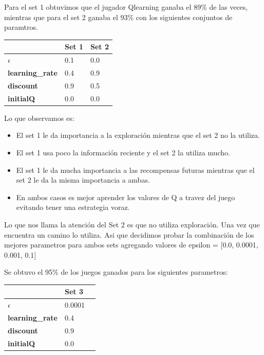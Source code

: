 Para el set 1 obtuvimos que el jugador Qlearning ganaba el 89\% de las veces, mientras que para el set 2 ganaba el 93\% con los siguientes conjuntos de paramtros. 

\begin{center}
    \begin{tabular}{| l | l | l |}
    \hline
     					    &  \textbf{Set 1} & \textbf{Set 2} \\ \hline
    \textbf{$\epsilon$}     &  0.1   		  & 0.0   \\
    \textbf{learning\_rate} &  0.4   		  & 0.9   \\ 
    \textbf{discount}       &  0.9  		  & 0.5   \\ 
	\textbf{initialQ} 		&  0.0   		  & 0.0   \\
    \hline
    \end{tabular}
\end{center}

Lo que observamos es:
\begin{itemize}
\item El set 1 le da importancia a la exploración mientras que el set 2 no la utiliza. \\
\item El set 1 usa poco la información reciente y el set 2 la utiliza mucho. \\
\item El set 1 le da mucha importancia a las recompensas futuras mientras que el set 2 le da la misma importancia a ambas. \\
\item En ambos casos es mejor aprender los valores de Q a travez del juego evitando tener una estrategia voraz.\\
\end{itemize}

 
Lo que nos llama la atención del Set 2 es que no utiliza exploración. Una vez que encuentra un camino lo utiliza. Asi que decidimos probar la combinación de los mejores parametros para ambos sets agregando valores de epsilon = $[$0.0, 0.0001, 0.001, 0.1$]$

Se obtuvo el 95\% de los juegos ganados para los siguientes parametros:
\begin{center}
    \begin{tabular}{| l | l | l |}
    \hline
     					    &  \textbf{Set 3} \\ \hline
    \textbf{$\epsilon$}     &  0.0001  		  \\
    \textbf{learning\_rate} &  0.4   		  \\ 
    \textbf{discount}       &  0.9  		  \\ 
	\textbf{initialQ} 		&  0.0   		  \\
    \hline
    \end{tabular}
\end{center}


